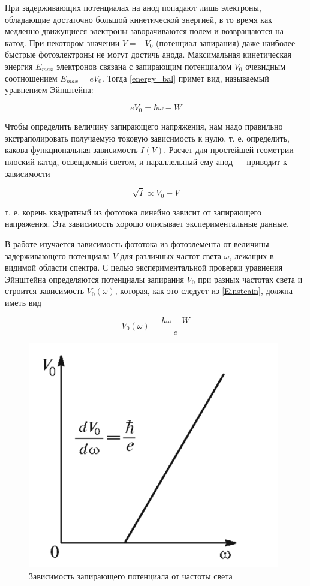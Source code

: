 \documentclass[15pt,a5paper,reqno]{article}
\begin{document}
	При задерживающих потенциалах на анод попадают лишь электроны,
	обладающие достаточно большой кинетической энергией, в то время
	как медленно движущиеся электроны заворачиваются полем и возвращаются на катод. При некотором значении $ V = -V_0 $ (потенциал запирания) даже наиболее быстрые фотоэлектроны не могут достичь
	анода.
	Максимальная кинетическая энергия $ E_{max} $ электронов связана с
	запирающим потенциалом $ V_0 $ очевидным соотношением $ E_{max} = eV_0 $. Тогда \eqref{energy_bal} примет вид, называемый уравнением Эйнштейна:
	
	\begin{equation}\label{Einsteain}
		eV_0 = \hbar\omega - W 
	\end{equation}
	
	Чтобы определить величину запирающего
	напряжения, нам надо правильно экстраполировать получаемую токовую зависимость к нулю, т. е. определить, какова функциональная
	зависимость $ I(V) $. Расчет для простейшей геометрии --- плоский катод, освещаемый светом, и параллельный ему анод --- приводит к зависимости
	
	\begin{equation}\label{sqrt I = V}
		\sqrt{I} \propto V_0 - V
	\end{equation}
	
	т. е. корень квадратный из фототока линейно
	зависит от запирающего напряжения. Эта зависимость хорошо описывает экспериментальные данные.
	
	В работе изучается зависимость фототока из фотоэлемента от величины задерживающего потенциала $ V $ для различных частот света $ \omega $, лежащих в видимой области спектра. С целью экспериментальной
	проверки уравнения Эйнштейна определяются потенциалы запирания
	$ V_0 $ при разных частотах света и строится зависимость $ V_0(\omega) $, которая, как это следует из \eqref{Einsteain}, должна иметь вид
	
	\begin{equation}\label{V(w)}
		V_0 (\omega) = \dfrac{\hbar\omega - W}{e}
	\end{equation}
	
	\begin{figure}[h!]
		\centering
		\includegraphics[width=11cm]{pics/V(w).png}
		\caption{Зависимость запирающего потенциала от частоты света}
		\label{dvdw}
	\end{figure}
	
\end{document}
